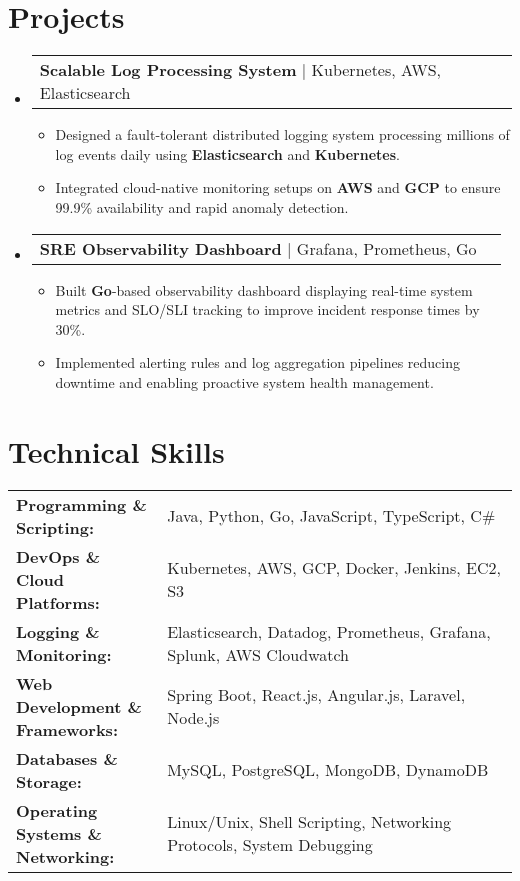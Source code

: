 \documentclass[letterpaper,11pt]{article}
\makeatletter
\newcommand{\resumeItem}[1]{
  \item\footnotesize{
    {#1 \vspace{-2pt}}
  }
}
\newcommand{\resumeProjectHeading}[2]{
    \item
    \begin{tabular*}{1.001\textwidth}{l@{\extracolsep{\fill}}r}
      \small#1 & \textbf{\small #2}\\
    \end{tabular*}\vspace{-7pt}
}
\newcommand{\resumeSubHeadingListStart}{\begin{itemize}[leftmargin=0pt, label={}]}
\newcommand{\resumeSubHeadingListEnd}{\end{itemize}}
\newcommand{\resumeItemListStart}{\begin{itemize}[leftmargin=*]}
\newcommand{\resumeItemListEnd}{\end{itemize}\vspace{-5pt}}
\makeatother
\begin{document}
\section{Projects}
    \vspace{-5pt}
    \resumeSubHeadingListStart
      \resumeProjectHeading
          {\textbf{Scalable Log Processing System} | Kubernetes, AWS, Elasticsearch}
          {}
          \resumeItemListStart
              \resumeItem{Designed a fault-tolerant distributed logging system processing millions of log events daily using \textbf{Elasticsearch} and \textbf{Kubernetes}.}
              \resumeItem{Integrated cloud-native monitoring setups on \textbf{AWS} and \textbf{GCP} to ensure 99.9\% availability and rapid anomaly detection.}
          \resumeItemListEnd
          \vspace{-16pt}
      \resumeProjectHeading
          {\textbf{SRE Observability Dashboard} | Grafana, Prometheus, Go}
          {}
          \resumeItemListStart
              \resumeItem{Built \textbf{Go}-based observability dashboard displaying real-time system metrics and SLO/SLI tracking to improve incident response times by 30\%.}
              \resumeItem{Implemented alerting rules and log aggregation pipelines reducing downtime and enabling proactive system health management.}
          \resumeItemListEnd
    \resumeSubHeadingListEnd
\vspace{-10pt}
\section{Technical Skills}
        \vspace{-14pt}
        \begin{table}[h]
            \footnotesize
            \begin{tabular}{p{0.3\linewidth} p{0.7\linewidth}}
                \textbf{Programming \& Scripting:} & Java, Python, Go, JavaScript, TypeScript, C\# \\
                \textbf{DevOps \& Cloud Platforms:} & Kubernetes, AWS, GCP, Docker, Jenkins, EC2, S3 \\
                \textbf{Logging \& Monitoring:} & Elasticsearch, Datadog, Prometheus, Grafana, Splunk, AWS Cloudwatch \\
                \textbf{Web Development \& Frameworks:} & Spring Boot, React.js, Angular.js, Laravel, Node.js \\
                \textbf{Databases \& Storage:} & MySQL, PostgreSQL, MongoDB, DynamoDB \\
                \textbf{Operating Systems \& Networking:} & Linux/Unix, Shell Scripting, Networking Protocols, System Debugging \\
            \end{tabular}
        \end{table}
\end{document}
